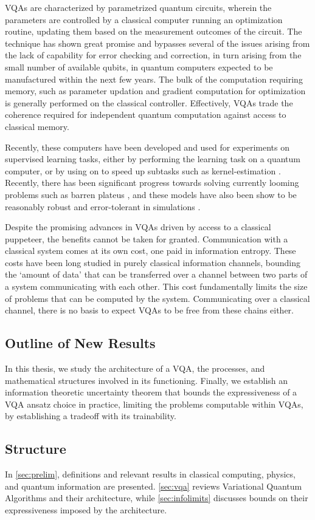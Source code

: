 VQAs are characterized by parametrized quantum circuits, wherein the parameters
are controlled by a classical computer running an optimization routine, updating
them based on the measurement outcomes of the circuit. The technique has shown
great promise and bypasses several of the issues arising from the lack of
capability for error checking and correction, in turn arising from the small
number of available qubits, in quantum computers expected to be manufactured
within the next few years. The bulk of the computation requiring memory, such as
parameter updation and gradient computation for optimization is generally
performed on the classical controller. Effectively, VQAs trade the coherence
required for independent quantum computation against access to classical memory.

Recently, these computers have been developed and used for experiments on
supervised learning tasks, either by performing the learning task on a quantum
computer, or by using on to speed up subtasks such as kernel-estimation
\cite{Havlíček2019,farhi2018arxivclassification}. Recently, there has been
significant progress towards solving currently looming problems such as barren
plateus \cite{zhang2020trainability}, and these models have also been show to be
reasonably robust and error-tolerant in simulations
\cite{schuld2020circuitcentric}. 

Despite the promising advances in VQAs driven by access to a classical
puppeteer, the benefits cannot be taken for granted. Communication with a
classical system comes at its own cost, one paid in information entropy. These
costs have been long studied in purely classical information channels, bounding
the `amount of data' that can be transferred over a channel between two parts of
a system communicating with each other. This cost fundamentally limits the size
of problems that can be computed by the system. Communicating over a classical
channel, there is no basis to expect VQAs to be free from these chains either.

\subsection{Outline of New Results}
In this thesis, we study the architecture of a VQA, the processes, and
mathematical structures involved in its functioning. Finally, we establish an
information theoretic uncertainty theorem that bounds the expressiveness of a
VQA ansatz choice in practice, limiting the problems computable within VQAs, by
establishing a tradeoff with its trainability.

\subsection{Structure}
In \autoref{sec:prelim}, definitions and relevant results in classical
computing, physics, and quantum information are presented.  \autoref{sec:vqa}
reviews Variational Quantum Algorithms and their architecture, while
\autoref{sec:infolimits} discusses bounds on their expressiveness imposed by the
architecture.

